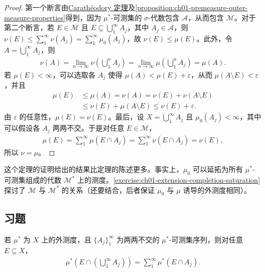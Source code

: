 \documentclass[../../main.tex]{subfiles}%
\begin{document}
\begin{proof}
第一个断言由\hyperref[theorem:ch01-caratheodory]{Carathéodory 定理}及\cref{proposition:ch01-premeasure-outer-measure-properties}得到，因为 $\mu^*$-可测集的 $\sigma$-代数包含 $\mathscr{A}$，从而包含 $\mathscr{M}$。对于第二个断言，若 $E\in\mathscr{M}$ 且 $E\subseteq\bigcup_1^\infty A_j$，其中 $A_j\in\mathscr{A}$，则 $\nu(E)\leqslant\sum_1^\infty\nu(A_j)=\sum_1^\infty\mu_0(A_j)$，故 $\nu(E)\leqslant\mu(E)$。此外，令 $A=\bigcup_1^\infty A_j$，则
\begin{align*}
\nu(A)=\lim_{n\to\infty}\nu\left(\bigcup_1^n A_j\right)=\lim_{n\to\infty}\mu\left(\bigcup_1^n A_j\right)=\mu(A).
\end{align*}
若 $\mu(E)<\infty$，可以选取各 $A_j$ 使得 $\mu(A)<\mu(E)+\varepsilon$，从而 $\mu(A\setminus E)<\varepsilon$，并且
\begin{align*}
\mu(E)&\leqslant\mu(A)=\nu(A)=\nu(E)+\nu(A\setminus E)\\
&\leqslant\nu(E)+\mu(A\setminus E)\leqslant\nu(E)+\varepsilon.
\end{align*}
由 $\varepsilon$ 的任意性，$\mu(E)=\nu(E)$。最后，设 $X=\bigcup_1^\infty A_j$ 且 $\mu_0(A_j)<\infty$，其中可以假设各 $A_j$ 两两不交。于是对任意 $E\in\mathscr{M}$，
\begin{align*}
\mu(E)=\sum_1^\infty\mu(E\cap A_j)=\sum_1^\infty\nu(E\cap A_j)=\nu(E),
\end{align*}
所以 $\nu=\mu$。
\end{proof}

这个定理的证明给出的结果比定理的陈述更多。事实上，$\mu_0$ 可以延拓为所有 $\mu^*$-可测集组成的代数 $\mathscr{M}^*$ 上的测度。\cref{exercise:ch01-extension-completion-saturation}探讨了 $\mathscr{M}$ 与 $\mathscr{M}^*$ 的关系（还要结合，后者保证 $\mu_0$ 与 $\mu$ 诱导的外测度相同）。

\subsection*{习题}

\begin{exercise}\label{exercise:ch01-outer-measure-disjoint}
若 $\mu^*$ 为 $X$ 上的外测度，且 $\{A_j\}_1^\infty$ 为两两不交的 $\mu^*$-可测集序列，则对任意 $E\subseteq X$，
\begin{align*}
\mu^*\left(E\cap\left(\bigcup_1^\infty A_j\right)\right)=\sum_1^\infty\mu^*(E\cap A_j).
\end{align*}
\end{exercise}
\end{document}
